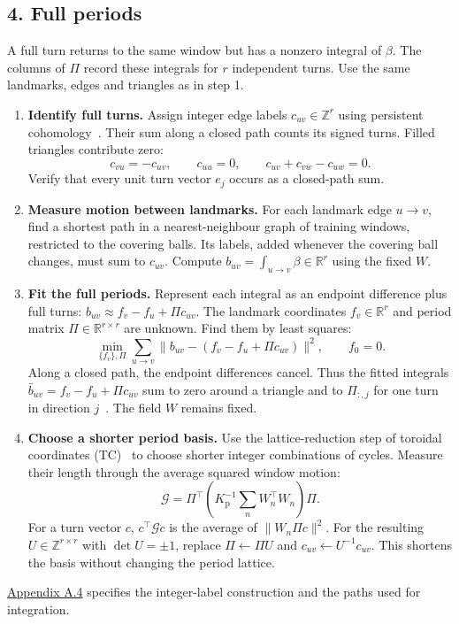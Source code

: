 \documentclass[11pt,a4paper]{article}
\newcommand{\R}{\mathbb R}
\newcommand{\Z}{\mathbb Z}
\begin{document}
\subsection*{4. Full periods}
A full turn returns to the same window but has a nonzero integral of
$\beta$. The columns of $\Pi$ record these integrals for $r$ independent
turns. Use the same landmarks, edges and triangles as in step 1.
\begin{enumerate}
\setlength{\itemsep}{2pt}
\item \textbf{Identify full turns.}
Assign integer edge labels $c_{uv}\in\Z^r$ using persistent
cohomology~\citep{deSilva2011}. Their sum along a closed path counts its
signed turns. Filled triangles contribute zero:
\[
c_{vu}=-c_{uv},\qquad c_{uu}=0,\qquad c_{uv}+c_{vw}-c_{uw}=0.
\]
Verify that every unit turn vector $e_j$ occurs as a closed-path sum.
\item \textbf{Measure motion between landmarks.}
For each landmark edge $u\to v$, find a shortest path in a nearest-neighbour
graph of training windows, restricted to the covering balls.
Its labels, added whenever the covering ball changes, must sum
to $c_{uv}$. Compute $b_{uv}=\int_{u\to v}\beta\in\R^r$ using the fixed $W$.
\item \textbf{Fit the full periods.}
Represent each integral as an endpoint difference plus full turns:
$b_{uv}\approx f_v-f_u+\Pi c_{uv}$.
The landmark coordinates $f_v\in\R^r$ and period matrix
$\Pi\in\R^{r\times r}$ are unknown. Find them by least squares:
\[
\min_{\{f_v\},\Pi}\sum_{u\to v}
\|b_{uv}-(f_v-f_u+\Pi c_{uv})\|^2,\qquad f_0=0.
\]
Along a closed path, the endpoint differences cancel. Thus the fitted
integrals $\bar b_{uv}=f_v-f_u+\Pi c_{uv}$ sum to zero around a triangle
and to $\Pi_{:,j}$ for one turn in direction $j$~\citep{Jiang2011}.
The field $W$ remains fixed.
\item \textbf{Choose a shorter period basis.}
Use the lattice-reduction step of toroidal coordinates
(TC)~\citep{Scoccola2023} to choose shorter integer combinations of cycles.
Measure their length through the average squared window motion:
\[
\mathcal G=\Pi^\top\left(K_{\mathrm p}^{-1}\sum_n W_n^\top W_n\right)\Pi.
\]
For a turn vector $c$, $c^\top\mathcal Gc$ is the average of
$\|W_n\Pi c\|^2$. For the resulting $U\in\Z^{r\times r}$ with $\det U=\pm1$, replace
$\Pi\leftarrow\Pi U$ and $c_{uv}\leftarrow U^{-1}c_{uv}$.
This shortens the basis without changing the period lattice.
\end{enumerate}
\hyperref[app:topology]{Appendix A.4} specifies the integer-label
construction and the paths used for integration.
\end{document}
